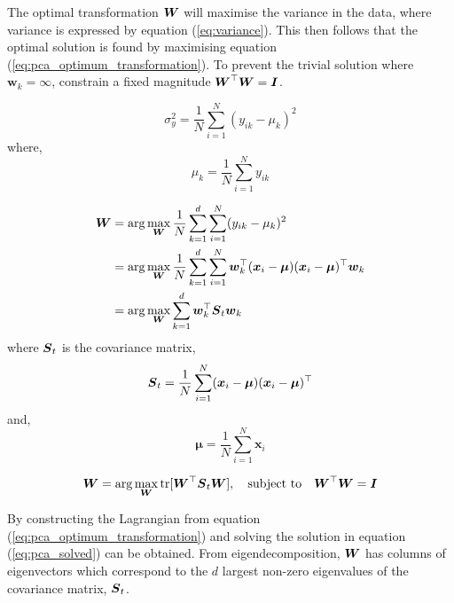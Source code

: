 \bigskip
The optimal transformation ${\boldsymbol{{W}}}$ will maximise the variance in the data, where variance is expressed by equation (\ref{eq:variance}).
This then follows that the optimal solution is found by maximising equation (\ref{eq:pca_optimum_transformation}).
To prevent the trivial solution where $\bm{w}_k = \infty$, constrain a fixed magnitude ${\boldsymbol{{W}}}^\top {\boldsymbol{{W}}} = {\boldsymbol{{I}}}$.


\begin{equation} \label{eq:variance}
    \sigma_y^2 = \frac{1}{N} \sum_{i=1}^{N} (y_{ik} - \mu_k)^2
\end{equation}
where,
\begin{equation*}
    \mu_k = \frac{1}{N} \sum_{i=1}^N y_{ik}
\end{equation*}

\begin{align*}
    {\boldsymbol{{W}}} &=\operatorname*{arg}\operatorname*{max}_{\boldsymbol{{W}}} 
                \frac{1}{N} \sum_{k=1}^{d} \sum_{i=1}^{N} 
                (y_{ik} - \mu_k)^2 \\
            &=\operatorname*{arg}\operatorname*{max}_{\boldsymbol{{W}}} 
                \frac{1}{N} \sum_{k=1}^{d} \sum_{i=1}^{N} 
                {\boldsymbol{{w}}}_k^\top 
                ({\boldsymbol{{x}}}_i - {\boldsymbol{{\mu}}})
                ({\boldsymbol{{x}}}_i - {\boldsymbol{{\mu}}})^\top 
                {\boldsymbol{{w}}}_k \\
            &=\operatorname*{arg}\operatorname*{max}_{\boldsymbol{{W}}} 
                \sum_{k=1}^{d}
                {\boldsymbol{{w}}}_k^\top 
                {\boldsymbol{{S}}}_t
                {\boldsymbol{{w}}}_k \\
\end{align*}
where ${\boldsymbol{{S}}}_t$ is the covariance matrix,
\begin{equation} \label{eq:covariance}
    {\boldsymbol{{S}}}_t = \frac{1}{N} \sum_{i=1}^{N} 
                ({\boldsymbol{{x}}}_i - {\boldsymbol{{\mu}}})
                ({\boldsymbol{{x}}}_i - {\boldsymbol{{\mu}}})^\top 
\end{equation}
and,
\begin{equation*}
    \bm{\mu} = \frac{1}{N} \sum_{i=1}^N \bm{x}_i
\end{equation*}


\begin{equation} \label{eq:pca_optimum_transformation}
    {\boldsymbol{{W}}} = \operatorname*{arg}\operatorname*{max}_{\boldsymbol{{W}}} 
          \operatorname{tr}[{\boldsymbol{{W}}}^\top {\boldsymbol{{S}}}_t {\boldsymbol{{W}}}],
          \quad
    \text{subject to} \quad 
    {\boldsymbol{{W}}}^\top {\boldsymbol{{W}}} = {\boldsymbol{{I}}}
\end{equation}

\bigskip
By constructing the Lagrangian from equation (\ref{eq:pca_optimum_transformation}) and solving the solution in equation (\ref{eq:pca_solved}) can be obtained.
From eigendecomposition, ${\boldsymbol{{W}}}$ has columns of eigenvectors which correspond to the $d$ largest non-zero eigenvalues of the covariance matrix, ${\boldsymbol{{S}}}_t$.

